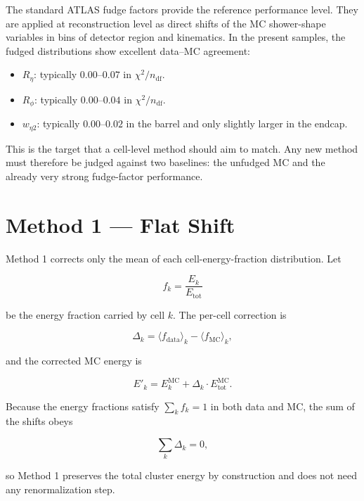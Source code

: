 \documentclass[11pt,a4paper]{article}
\newcommand{\Reta}{\ensuremath{R_{\eta}}}
\newcommand{\Rphi}{\ensuremath{R_{\phi}}}
\newcommand{\weta}{\ensuremath{w_{\eta 2}}}
\newcommand{\chisq}{\ensuremath{\chi^2 / n_{\mathrm{df}}}}
\begin{document}
The standard ATLAS fudge factors provide the reference performance level. They
are applied at reconstruction level as direct shifts of the MC shower-shape
variables in bins of detector region and kinematics. In the present samples,
the fudged distributions show excellent data--MC agreement:

\begin{itemize}
  \item \Reta: typically $0.00$--$0.07$ in \chisq.
  \item \Rphi: typically $0.00$--$0.04$ in \chisq.
  \item \weta: typically $0.00$--$0.02$ in the barrel and only slightly larger
  in the endcap.
\end{itemize}

This is the target that a cell-level method should aim to match. Any new method
must therefore be judged against two baselines: the unfudged MC and the already
very strong fudge-factor performance.

\section{Method 1 --- Flat Shift}

Method 1 corrects only the mean of each cell-energy-fraction distribution. Let

\begin{equation}
  f_k = \frac{E_k}{E_{\mathrm{tot}}}
\end{equation}

be the energy fraction carried by cell $k$. The per-cell correction is

\begin{equation}
  \Delta_k = \langle f_{\mathrm{data}} \rangle_k - \langle f_{\mathrm{MC}} \rangle_k,
\end{equation}

and the corrected MC energy is

\begin{equation}
  E'_k = E_k^{\mathrm{MC}} + \Delta_k \cdot E_{\mathrm{tot}}^{\mathrm{MC}}.
\end{equation}

Because the energy fractions satisfy $\sum_k f_k = 1$ in both data and MC, the
sum of the shifts obeys

\begin{equation}
  \sum_k \Delta_k = 0,
\end{equation}

so Method 1 preserves the total cluster energy by construction and does not
need any renormalization step.
\end{document}
